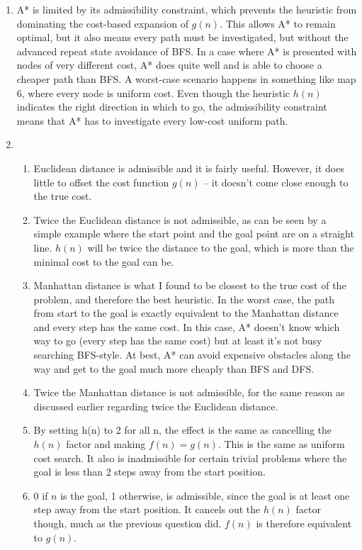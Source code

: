 \documentclass[11pt]{article}
\begin{document}
\begin{enumerate}
\item A* is limited by its admissibility constraint, which prevents the heuristic from dominating the cost-based expansion of $g(n)$. This allows A* to remain optimal, but it also means every path must be investigated, but without the advanced repeat state avoidance of BFS. In a case where A* is presented with nodes of very different cost, A* does quite well and is able to choose a cheaper path than BFS. A worst-case scenario happens in something like map 6, where every node is uniform cost. Even though the heuristic $h(n)$ indicates the right direction in which to go, the admissibility constraint means that A* has to investigate every low-cost uniform path.

\item \begin{enumerate}
	  \item Euclidean distance is admissible and it is fairly useful. However, it does little to offset the cost function $g(n)$ -- it doesn't come close enough to the true cost.
	  \item Twice the Euclidean distance is not admissible, as can be seen by a simple example where the start point and the goal point are on a straight line. $h(n)$ will be twice the distance to the goal, which is more than the minimal cost to the goal can be.

      \item Manhattan distance is what I found to be closest to the true cost of the problem, and therefore the best heuristic. In the worst case, the path from start to the goal is exactly equivalent to the Manhattan distance and every step has the same cost. In this case, A* doesn't know which way to go (every step has the same cost) but at least it's not busy searching BFS-style. At best, A* can avoid expensive obstacles along the way and get to the goal much more cheaply than BFS and DFS.

	  \item Twice the Manhattan distance is not admissible, for the same reason as discussed earlier regarding twice the Euclidean distance.

	  \item By setting h(n) to 2 for all n, the effect is the same as cancelling the $h(n)$ factor and making $f(n) = g(n)$. This is the same as uniform cost search. It also is inadmissible for certain trivial problems where the goal is less than 2 steps away from the start position.

	  \item 0 if $n$ is the goal, 1 otherwise, is admissible, since the goal is at least one step away from the start position. It cancels out the $h(n)$ factor though, much as the previous question did. $f(n)$ is therefore equivalent to $g(n)$.
	  \end{enumerate}


\end{enumerate}
\end{document}
